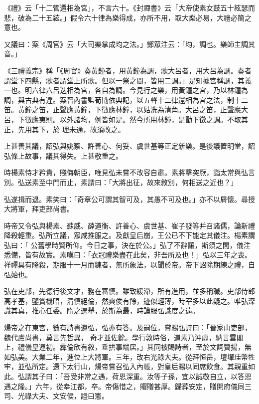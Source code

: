 \begin{pinyinscope}
 《禮》云「十二管還相為宮」，不言六十。《封禪書》云「大帝使素女鼓五十絃瑟而悲，破為二十五絃。」假令六十律為樂得成，亦所不用，取大樂必易，大禮必簡之意也。



 又議曰：案《周官》云「大司樂掌成均之法。」鄭眾注云：「均，調也。樂師主調其音。」



 《三禮義宗》稱「《周官》奏黃鐘者，用黃鐘為調，歌大呂者，用大呂為調。奏者謂堂下四縣，歌者謂堂上所歌。但以一祭之間，皆用二調。」是知據宮稱調，其義一也。明六律六呂迭相為宮，各自為調。今見行之樂，用黃鐘之宮，乃以林鐘為調，與古典有違。案晉內書監荀勖依典記，以五聲十二律還相為宮之法，制十二笛。黃鐘之笛，正聲應黃鐘，下徵應林鐘，以姑洗為清角。大呂之笛，正聲應大呂，下徵應夷則。以外諸均，例皆如是。然今所用林鐘，是勖下徵之調。不取其正，先用其下，於
 理未通，故須改之。



 上甚善其議，詔弘與姚察、許善心、何妥、虞世基等正定新樂。是後議置明堂，詔弘條上故事，議其得失。上甚敬重之。



 時楊素恃才矜貴，賤侮朝臣，唯見弘未嘗不改容自肅。素將擊突厥，詣太常與弘言別。弘送素至中門而止，素謂曰：「大將出征，故來敘別，何相送之近也？」



 弘遂揖而退。素笑曰：「奇章公可謂其智可及，其愚不可及也。」亦不以屑懷。尋授大將軍，拜吏部尚書。



 時帝又令弘與楊素、蘇威、薛道衡、許善心、虞世基、崔子發等并召諸儒，論新禮降殺輕重。弘所立議，眾咸推服之。及獻皇后崩，王公已不下能定其儀注。楊素謂弘曰：「
 公舊學時賢所仰。今日之事，決在於公。」弘了不辭讓，斯須之間，儀注悉備，皆有故實。素嘆曰：「衣冠禮樂盡在此矣，非吾所及也！」弘以三年之喪。祥禫具有降殺，期服十一月而練者，無所象法，以聞於帝。帝下詔除期練之禮，自弘始也。



 弘在吏部，先德行後文才，務在審慎。雖致緩滯，所有進用，並多稱職。吏部侍郎高孝基，鑒賞機晤，清慎絕倫，然爽俊有餘，迹似輕薄，時宰多以此疑之。唯弘深識其真，推心任委。隋之選舉，於斯為最，時論服弘識度之遠。



 煬帝之在東宮，數有詩書遺弘，弘亦有答。及嗣位，嘗賜弘詩曰：「晉家山吏部，魏代盧尚書，莫言先哲異，
 奇才並佐餘。學行敦時俗，道素乃沖虛，納言雲閣上，禮儀皇運初。彞倫欣有敘，垂拱事端居。」其同被賜詩者，至於文詞贊揚，無如弘美。大業二年，進位上大將軍。三年，改右光祿大夫。從拜恒岳，壇墠珪幣牲牢，並弘所定。還下太行山，煬帝嘗召弘入內帳，對皇后賜以同席飲食。其親重如此。弘謂其子曰：「吾受非常之遇，荷恩深重。汝等子孫，宜以誠敬自立，以答恩遇之隆。」六年，從幸江都，卒。帝傷惜之，賵贈甚厚。歸葬安定，贈開府儀同三司、光祿大夫、文安侯，謚曰憲。




\end{pinyinscope}
